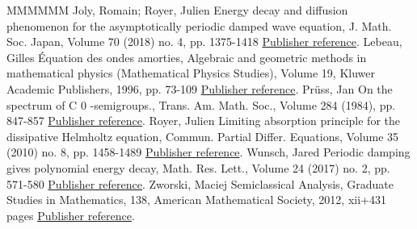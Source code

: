 \begin{thebibliography}{MMMMMM}
 Joly, Romain; Royer, Julien Energy decay and diffusion phenomenon for the asymptotically periodic damped wave equation, J. Math. Soc. Japan, Volume 70 (2018) no. 4, pp. 1375-1418 \href{https://ahl.centre-mersenne.org/item/AHL_2018__1__297_0/#JolyRo18}{Publisher reference}.
 Lebeau, Gilles Équation des ondes amorties, Algebraic and geometric methods in mathematical physics (Mathematical Physics Studies), Volume 19, Kluwer Academic Publishers, 1996, pp. 73-109 \href{https://ahl.centre-mersenne.org/item/AHL_2018__1__297_0/#Lebeau96}{Publisher reference}.
 Prüss, Jan On the spectrum of C 0 -semigroups., Trans. Am. Math. Soc., Volume 284 (1984), pp. 847-857 \href{https://ahl.centre-mersenne.org/item/AHL_2018__1__297_0/#Pruss84}{Publisher reference}.
 Royer, Julien Limiting absorption principle for the dissipative Helmholtz equation, Commun. Partial Differ. Equations, Volume 35 (2010) no. 8, pp. 1458-1489 \href{https://ahl.centre-mersenne.org/item/AHL_2018__1__297_0/#royer-mourre}{Publisher reference}.
 Wunsch, Jared Periodic damping gives polynomial energy decay, Math. Res. Lett., Volume 24 (2017) no. 2, pp. 571-580 \href{https://ahl.centre-mersenne.org/item/AHL_2018__1__297_0/#Wunsch}{Publisher reference}.
 Zworski, Maciej Semiclassical Analysis, Graduate Studies in Mathematics, 138, American Mathematical Society, 2012, xii+431 pages \href{https://ahl.centre-mersenne.org/item/AHL_2018__1__297_0/#zworski}{Publisher reference}.
\end{thebibliography}
